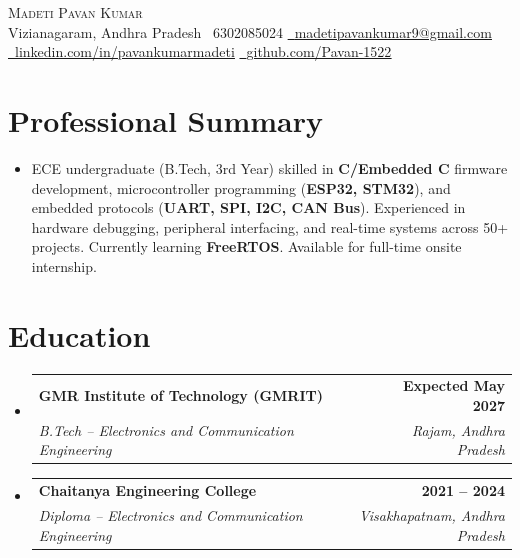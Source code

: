 \documentclass[letterpaper,10pt]{article}
\makeatletter
\newcommand{\resumeSubheading}[4]{
  \vspace{-2pt}\item
    \begin{tabular*}{1.0\textwidth}[t]{l@{\extracolsep{\fill}}r}
      \textbf{#1} & \textbf{\small #2} \\
      \textit{\small#3} & \textit{\small #4} \\
    \end{tabular*}\vspace{-4pt}
}
\newcommand{\resumeSubHeadingListStart}{\begin{itemize}[leftmargin=0.0in, label={}]}
\newcommand{\resumeSubHeadingListEnd}{\end{itemize}}
\makeatother
\begin{document}
\begin{center}
    {\Huge \scshape Madeti Pavan Kumar} \\ \vspace{4.5pt}
    \small
    Vizianagaram, Andhra Pradesh \textbar{}
    \faPhone\ 6302085024 \textbar{}
    \href{mailto:madetipavankumar9@gmail.com}{\faEnvelope\ \underline{madetipavankumar9@gmail.com}} \textbar{}
    \href{https://linkedin.com/in/pavankumarmadeti}{\faLinkedin\ \underline{linkedin.com/in/pavankumarmadeti}} \textbar{}
    \href{https://github.com/Pavan-1522}{\faGithub\ \underline{github.com/Pavan-1522}}
\end{center}

\vspace{-6pt}

\section{Professional Summary}
\resumeSubHeadingListStart
\item\small{
ECE undergraduate (B.Tech, 3rd Year) skilled in \textbf{C/Embedded C} firmware development, microcontroller programming (\textbf{ESP32, STM32}), and embedded protocols (\textbf{UART, SPI, I2C, CAN Bus}). Experienced in hardware debugging, peripheral interfacing, and real-time systems across 50+ projects. Currently learning \textbf{FreeRTOS}. Available for full-time onsite internship.
}
\resumeSubHeadingListEnd

\vspace{-6pt}

\section{Education}
\resumeSubHeadingListStart
  \resumeSubheading
    {GMR Institute of Technology (GMRIT)}{Expected May 2027}
    {B.Tech -- Electronics and Communication Engineering}{Rajam, Andhra Pradesh}
  \resumeSubheading
    {Chaitanya Engineering College}{2021 -- 2024}
    {Diploma -- Electronics and Communication Engineering}{Visakhapatnam, Andhra Pradesh}
\resumeSubHeadingListEnd

\vspace{-6pt}

\end{document}
